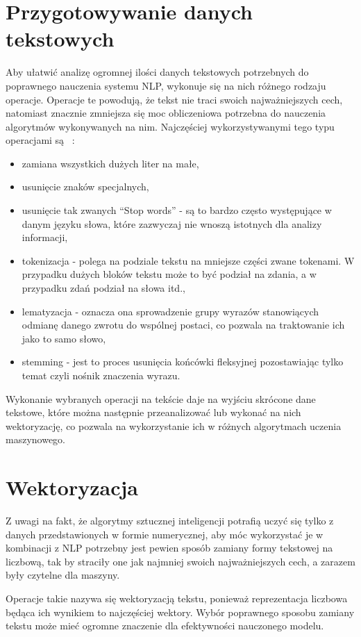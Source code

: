 \section{Przygotowywanie danych tekstowych}
Aby ułatwić analizę ogromnej ilości danych tekstowych potrzebnych do poprawnego nauczenia systemu NLP,
wykonuje się na nich różnego rodzaju operacje. Operacje te powodują, że tekst nie traci swoich najważniejszych cech, 
natomiast znacznie zmniejsza się moc obliczeniowa potrzebna do nauczenia algorytmów wykonywanych na nim. 
Najczęściej wykorzystywanymi tego typu operacjami są ~\cite{preprocessing}:
\begin{itemize}
    \item zamiana wszystkich dużych liter na małe,
    \item usunięcie znaków specjalnych,
    \item usunięcie tak zwanych ``Stop words'' - są to bardzo często występujące w danym języku słowa, które 
    zazwyczaj nie wnoszą istotnych dla analizy informacji,
    \item tokenizacja - polega na podziale tekstu na mniejsze części zwane tokenami. W przypadku dużych bloków 
    tekstu może to być podział na zdania, a w przypadku zdań podział na słowa itd.,
    \item lematyzacja - oznacza ona sprowadzenie grupy wyrazów stanowiących odmianę danego zwrotu do wspólnej postaci,
    co pozwala na traktowanie ich jako to samo słowo,
    \item stemming - jest to proces usunięcia końcówki fleksyjnej pozostawiając tylko temat czyli nośnik znaczenia 
    wyrazu.
\end{itemize}
Wykonanie wybranych operacji na tekście daje na wyjściu skrócone dane tekstowe, które można następnie przeanalizować lub 
wykonać na nich wektoryzację, co pozwala na wykorzystanie ich w różnych algorytmach uczenia maszynowego. 
\section{Wektoryzacja}
Z uwagi na fakt, że algorytmy sztucznej inteligencji potrafią uczyć się tylko z danych przedstawionych w formie numerycznej, aby móc 
wykorzystać je w kombinacji z NLP potrzebny jest pewien sposób zamiany formy tekstowej na liczbową, tak by straciły one jak najmniej
swoich najważniejszych cech, a zarazem były czytelne dla maszyny. 

Operacje takie nazywa się wektoryzacją tekstu, ponieważ 
reprezentacja liczbowa będąca ich wynikiem to najczęściej wektory. 
Wybór poprawnego sposobu zamiany tekstu może mieć ogromne znaczenie dla efektywności nauczonego modelu.

